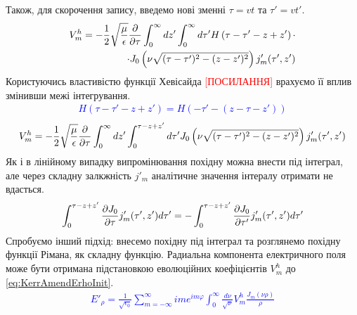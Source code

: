 %
Також, для скорочення запису, введемо нові зменні $ \tau = vt $ та 
$ \tau' = vt' $.
%
\begin{equation*} \begin{aligned} 
V_m^h = - \frac{1}{2} \sqrt{\frac{\mu}{\epsilon}} \frac{\partial }{\partial \tau} 
\int_0^\infty dz' \int_0^\infty d \tau'
H \left( \tau - \tau' - z + z' \right) \cdot \\
\cdot J_0 \left( \nu \sqrt{(\tau-\tau')^2 - (z-z')^2} \right) j'_m (\tau',z')
\end{aligned} \end{equation*}
%
Користуючись властивістю функції Хевісайда \textcolor{red} {[ПОСИЛАННЯ]} 
врахуємо її вплив змінивши межі інтегрування.
%
\textcolor{blue} { \begin{equation*} \begin{aligned} 
H \left( \tau - \tau' - z + z' \right) = 
H \left( - \tau' - ( z  - \tau - z' ) \right)
\end{aligned} \end{equation*} }
%
\begin{equation*} \begin{aligned} 
V_m^h = - \frac{1}{2} \sqrt{\frac{\mu}{\epsilon}} \frac{\partial }{\partial \tau} 
\int_0^\infty dz' \int_0^{\tau - z + z'} d \tau'
J_0 \left( \nu \sqrt{(\tau-\tau')^2 - (z-z')^2} \right) j'_m (\tau',z')
\end{aligned} \end{equation*}
%
Як і в лінійному випадку випромінювання похідну можна внести під інтеграл, але 
через складну залкжність $ j'_m $ аналітичне значення інтералу отримати не вдасться.
%
\begin{equation*} \begin{aligned} 
\int_0^{\tau - z + z'} \frac{\partial J_0}{\partial \tau} j'_m (\tau',z') d \tau' =
- \int_0^{\tau - z + z'} \frac{\partial J_0}{\partial \tau'} j'_m (\tau',z') d \tau'
\end{aligned} \end{equation*}
%
Спробуємо інший підхід: внесемо похідну під інтеграл та розглянемо похідну функції
Рімана, як складну функцію.
%
Радиальна компонента електричного поля може бути отримана підстановкою 
еволюційних коефіцієнтів $ V_m^h $ до \eqref{eq:KerrAmendErhoInit}.
%
\textcolor{blue} {  \begin{equation*} \begin{aligned} 
E'_\rho = \frac{1}{\sqrt{\epsilon_0}} \sum_{m=-\infty}^{\infty} 
i m e^{im\varphi} \int_{0}^{\infty} \frac{d \nu}{\sqrt{\nu}} 
V_m^h \frac{J_m(\nu \rho)}{\rho}
\end{aligned} \end{equation*} }
